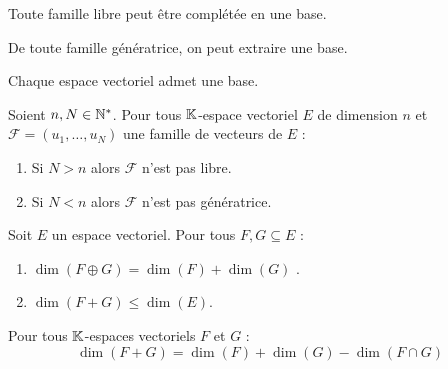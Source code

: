 \begin{theorem}
	Toute famille libre peut être complétée en une base.
\end{theorem}

\begin{theorem}
    De toute famille génératrice, on peut extraire une base.
\end{theorem}

\begin{theorem}
    Chaque espace vectoriel admet une base.
\end{theorem}

\begin{corollary}
	Soient $n, N \in \mathbb{N}^*$. Pour tous $\mathbb{K}$-espace vectoriel $E$ de dimension $n$ et $\mathcal{F} = (u_1, \ldots, u_N)$ une famille de vecteurs de $E$ :
	\begin{enumerate}
		\item Si $N > n$ alors $\mathcal{F}$ n'est pas libre.
		\item Si $N < n$ alors $\mathcal{F}$ n'est pas génératrice.
	\end{enumerate}
\end{corollary}

\begin{proposition}
	Soit $E$ un espace vectoriel. Pour tous $F, G\subseteq E$ :
	\begin{multicols}{2}
	    \begin{enumerate}
    		\item $\dim(F \oplus G) = \dim(F) + \dim(G)$ .
    		\item $\dim(F + G) \leq \dim(E)$.
    	\end{enumerate}
	\end{multicols}
\end{proposition}

\begin{theorem}
	Pour tous $\mathbb{K}$-espaces vectoriels $F$ et $G$ :
	\[ \dim(F+G) = \dim(F) + \dim(G) - \dim(F\cap G) \]
\end{theorem}

